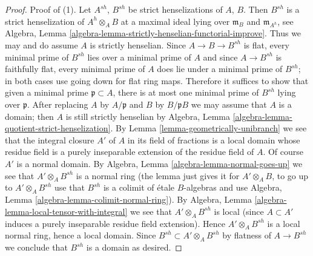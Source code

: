 \begin{proof}
\medskip\noindent
Proof of (1). Let $A^{sh}$, $B^{sh}$ be strict henselizations
of $A$, $B$. Then $B^{sh}$ is a strict henselization of
$A^h \otimes_A B$ at a maximal ideal lying over $\mathfrak m_B$
and $\mathfrak m_{A^h}$, see
Algebra, Lemma \ref{algebra-lemma-strictly-henselian-functorial-improve}.
Thus we may and do assume $A$ is strictly henselian.
Since $A \to B \to B^{sh}$ is flat, every minimal prime of $B^{sh}$
lies over a minimal prime of $A$ and since $A \to B^{sh}$ is faithfully flat,
every minimal prime of $A$ does lie under a minimal prime of $B^{sh}$;
in both cases use going down for flat ring maps.
Therefore it suffices to show that given a minimal prime
$\mathfrak p \subset A$, there is at most one minimal prime
of $B^{sh}$ lying over $\mathfrak p$.
After replacing $A$ by $A/\mathfrak p$ and $B$ by $B/\mathfrak p B$
we may assume that $A$ is a domain; then $A$ is still strictly henselian by
Algebra, Lemma \ref{algebra-lemma-quotient-strict-henselization}.
By Lemma \ref{lemma-geometrically-unibranch} we see that the integral closure
$A'$ of $A$ in its field of fractions is a local domain whose residue
field is a purely inseparable extension of the residue field of $A$.
Of course $A'$ is a normal domain. By
Algebra, Lemma \ref{algebra-lemma-normal-goes-up}
we see that $A' \otimes_A B^{sh}$ is a normal ring
(the lemma just gives it for $A' \otimes_A B$, to go up to
$A' \otimes_A B^{sh}$ use that $B^{sh}$ is a colimit of \'etale
$B$-algebras and use Algebra, Lemma \ref{algebra-lemma-colimit-normal-ring}).
By Algebra, Lemma \ref{algebra-lemma-local-tensor-with-integral}
we see that $A' \otimes_A B^{sh}$ is local (since $A \subset A'$
induces a purely inseparable residue field extension).
Hence $A' \otimes_A B^{sh}$ is a local normal ring, hence a local domain.
Since $B^{sh} \subset A' \otimes_A B^{sh}$ by flatness of $A \to B^{sh}$
we conclude that $B^{sh}$ is a domain as desired.
\end{proof}